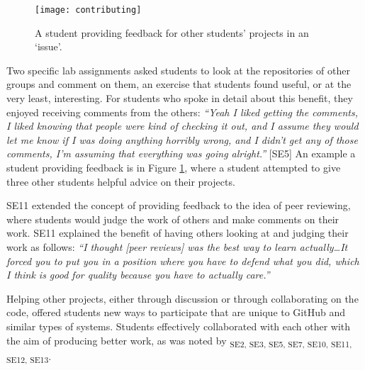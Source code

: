 \begin{figure}[h!]
 \caption{A student providing feedback for other students' projects in an `issue'.}
 \centering
   \texttt{[image: contributing]}
 \label{fig:contributing}
\end{figure}

Two specific lab assignments asked students to look at the repositories of other groups and comment on them, an exercise that students found useful, or at the very least, interesting. For students who spoke in detail about this benefit, they enjoyed receiving comments from the others: \textit{``Yeah I liked getting the comments, I liked knowing that people were kind of checking it out, and I assume they would let me know if I was doing anything horribly wrong, and I didn't get any of those comments, I'm assuming that everything was going alright.''} [SE5] An example a student providing feedback is in Figure \ref{fig:contributing}, where a student attempted to give three other students helpful advice on their projects.

SE11 extended the concept of providing feedback to the idea of peer reviewing, where students would judge the work of others and make comments on their work. SE11 explained the benefit of having others looking at and judging their work as follows: \textit{``I thought [peer reviews] was the best way to learn actually\ldots It forced you to put you in a position where you have to defend what you did, which I think is good for quality because you have to actually care.''}

Helping other projects, either through discussion or through collaborating on the code, offered students new ways to participate that are unique to GitHub and similar types of systems. Students effectively collaborated with each other with the aim of producing better work, as was noted by \textsubscript{SE2, SE3, SE5, SE7, SE10, SE11, SE12, SE13}. \\


